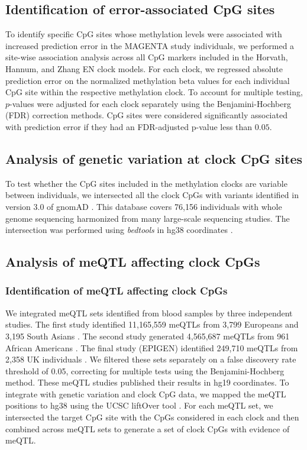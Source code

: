 \subsection{Identification of error-associated CpG sites}
To identify specific CpG sites whose methylation levels were associated with increased 
prediction error in the MAGENTA study individuals, we performed a site-wise association analysis across all CpG markers included in the Horvath, Hannum, and Zhang EN clock models. For each clock, we regressed absolute prediction error on the 
normalized methylation beta values for each individual CpG site within the respective methylation clock. To account for multiple testing, $p$-values were 
adjusted for each clock separately using the Benjamini-Hochberg (FDR) 
correction methods. CpG sites were considered significantly associated with prediction 
error if they had an FDR-adjusted p-value less than $0.05$.

\subsection{Analysis of genetic variation at clock CpG sites}
To test whether the CpG sites included in the methylation clocks are variable between individuals, we intersected all the clock CpGs with variants identified in version 3.0 of gnomAD \citep{karczewski_mutational_2020}. This database covers 76,156 individuals with whole genome sequencing harmonized from many large-scale sequencing studies. The intersection was performed using \textit{bedtools} in hg38 coordinates \citep{quinlan_bedtools_2010}.

\subsection{Analysis of meQTL affecting clock CpGs}
\subsubsection*{Identification of meQTL affecting clock CpGs}
We integrated meQTL sets identified from blood samples by three independent studies. The first study  identified 11,165,559 meQTLs from 3,799 Europeans and 3,195 South Asians \citep{hawe_genetic_2022}. The second study  generated 4,565,687 meQTLs from 961 African Americans \citep{shang_meqtl_2023}. The final study (EPIGEN) identified 249,710 meQTLs from 2,358 UK individuals \citep{villicana_genetic_2023}. We filtered these sets separately on a false discovery rate  threshold of 0.05, correcting for multiple tests using the Benjamini-Hochberg method. These meQTL studies published their results in hg19 coordinates. To integrate with genetic variation and clock CpG data, we mapped the meQTL positions to hg38 using the UCSC liftOver tool \citep{hinrichs_ucsc_2006}. For each meQTL set, we intersected the target CpG site with the CpGs considered in each clock and then combined across meQTL sets to generate a set of clock CpGs with evidence of meQTL. 

